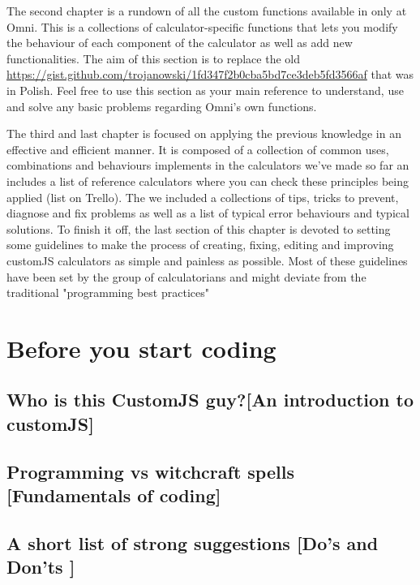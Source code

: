 \documentclass[11pt,a4paper,oldfontcommands]{memoir}
\begin{document}
The second chapter is a rundown of all the custom functions available in only at Omni. This is a collections of calculator-specific functions that lets you modify the behaviour of each component of the calculator as well as add new functionalities. The aim of this section is to replace the old \href{gist}{https://gist.github.com/trojanowski/1fd347f2b0cba5bd7ce3deb5fd3566af} that was in Polish. Feel free to use this section as your main reference to understand, use and solve any basic problems regarding Omni's own functions. 

The third and last chapter is focused on applying the previous knowledge in an effective and efficient manner. It is composed of a collection of common uses, combinations and behaviours implements in the calculators we've made so far an includes a list of reference calculators where you can check these principles being applied (list on Trello). The we included a collections of tips, tricks to prevent, diagnose and fix problems as well as a list of typical error behaviours and typical solutions. To finish it off, the last section of this chapter is devoted to setting some guidelines to make the process of creating, fixing, editing and improving customJS calculators as simple and painless as possible. Most of these guidelines have been set by the group of calculatorians and might deviate from the traditional "programming best practices"

\chapter{Before you start coding}
    \label{chap:b4}
    
    \section{Who is this CustomJS guy?\small[An introduction to customJS]}
        \label{sec:whatIs}
        
    
    
    
    \section{Programming vs witchcraft spells \small[Fundamentals of coding]}    
        \label{sec:fundamentals}
        
    
    \section{A short list of strong suggestions \small{[Do's and Don'ts ]}}
        \label{sec:suggestions}
        
\end{document}
